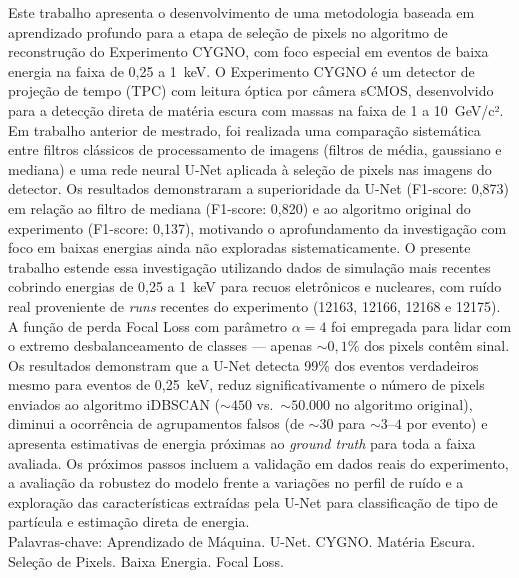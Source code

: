 \documentclass[
       oneside,
       english,
       brazil
       ]{abntbibufjf}
\begin{document}
\begin{resumo}

Este trabalho apresenta o desenvolvimento de uma metodologia baseada em
aprendizado profundo para a etapa de seleção de pixels no algoritmo de
reconstrução do Experimento CYGNO, com foco especial em eventos de baixa
energia na faixa de 0,25 a 1~keV. O Experimento CYGNO é um detector de
projeção de tempo (TPC) com leitura óptica por câmera sCMOS, desenvolvido
para a detecção direta de matéria escura com massas na faixa de 1 a
10~GeV/c². Em trabalho anterior de mestrado, foi realizada uma comparação
sistemática entre filtros clássicos de processamento de imagens (filtros de
média, gaussiano e mediana) e uma rede neural U-Net aplicada à seleção de
pixels nas imagens do detector. Os resultados demonstraram a superioridade da
U-Net (F1-score: 0,873) em relação ao filtro de mediana (F1-score: 0,820) e
ao algoritmo original do experimento (F1-score: 0,137), motivando o
aprofundamento da investigação com foco em baixas energias ainda não
exploradas sistematicamente. O presente trabalho estende essa investigação
utilizando dados de simulação mais recentes cobrindo energias de 0,25 a
1~keV para recuos eletrônicos e nucleares, com ruído real proveniente de
\textit{runs} recentes do experimento (12163, 12166, 12168 e 12175). A função
de perda Focal Loss com parâmetro $\alpha = 4$ foi empregada para lidar com o
extremo desbalanceamento de classes — apenas ${\sim}0,1\%$ dos pixels contêm
sinal. Os resultados demonstram que a U-Net detecta 99\% dos eventos
verdadeiros mesmo para eventos de 0,25~keV, reduz significativamente o número
de pixels enviados ao algoritmo iDBSCAN (${\sim}450$ vs.\ ${\sim}50{.}000$ no
algoritmo original), diminui a ocorrência de agrupamentos falsos (de ${\sim}30$
para ${\sim}3$--$4$ por evento) e apresenta estimativas de energia próximas ao
\textit{ground truth} para toda a faixa avaliada. Os próximos passos incluem
a validação em dados reais do experimento, a avaliação da robustez do modelo
frente a variações no perfil de ruído e a exploração das características
extraídas pela U-Net para classificação de tipo de partícula e estimação
direta de energia.\\[18pt]
Palavras-chave: Aprendizado de Máquina. U-Net. CYGNO. Matéria Escura.
Seleção de Pixels. Baixa Energia. Focal Loss.
\end{resumo}
\end{document}
